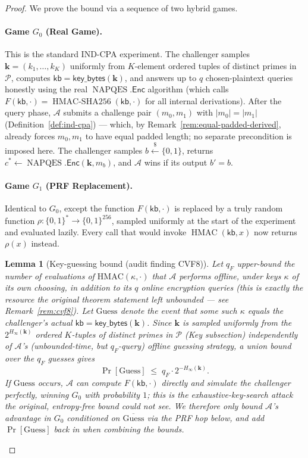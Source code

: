 \documentclass[11pt,a4paper]{article}
\newtheorem{lemma}[theorem]{Lemma}
\begin{document}
\begin{proof}
We prove the bound via a sequence of two hybrid games.

\paragraph{Game $G_0$ (Real Game).}
This is the standard IND-CPA experiment.  The challenger samples
$\mathbf{k}=(k_1,\ldots,k_K)$ uniformly from $K$-element ordered tuples
of distinct primes in~$\mathcal{P}$, computes $\mathsf{kb}=\mathsf{key\_bytes}(\mathbf{k})$,
and answers up to $q$ chosen-plaintext queries honestly using the real
$\operatorname{NAPQES}.\mathsf{Enc}$ algorithm (which calls
$F(\mathsf{kb},\cdot)=\operatorname{HMAC\text{-}SHA256}(\mathsf{kb},\cdot)$
for all internal derivations).  After the query phase,
$\mathcal{A}$ submits a challenge pair $(m_0,m_1)$ with $|m_0|=|m_1|$
(Definition~\ref{def:ind-cpa}) --- which, by
Remark~\ref{rem:equal-padded-derived}, already forces $m_0,m_1$ to have
equal padded length; no separate precondition is imposed here.
The challenger samples $b\xleftarrow{\$}\{0,1\}$, returns
$c^*\gets\operatorname{NAPQES}.\mathsf{Enc}(\mathbf{k},m_b)$, and
$\mathcal{A}$ wins if its output $b'=b$.

\paragraph{Game $G_1$ (PRF Replacement).}
Identical to $G_0$, except the function $F(\mathsf{kb},\cdot)$ is
replaced by a truly random function $\rho:\{0,1\}^*\to\{0,1\}^{256}$,
sampled uniformly at the start of the experiment and evaluated lazily.
Every call that would invoke $\operatorname{HMAC}(\mathsf{kb},x)$ now
returns $\rho(x)$ instead.

\begin{lemma}[Key-guessing bound (audit finding CVF8)]\label{lem:key-guess}
Let $q_F$ upper-bound the number of evaluations of
$\mathrm{HMAC}(\kappa,\cdot)$ that $\mathcal{A}$ performs \emph{offline},
under keys $\kappa$ of its own choosing, in addition to its $q$ online
encryption queries (this is exactly the resource the original theorem
statement left unbounded --- see Remark~\ref{rem:cvf8}). Let $\mathrm{Guess}$
denote the event that some such $\kappa$ equals the challenger's actual
$\mathsf{kb}=\mathsf{key\_bytes}(\mathbf{k})$. Since $\mathbf{k}$ is sampled
uniformly from the $2^{H_\infty(\mathbf{k})}$ ordered $K$-tuples of distinct
primes in $\mathcal{P}$ (Key subsection) independently of $\mathcal{A}$'s
(unbounded-time, but $q_F$-query) offline guessing strategy, a union bound
over the $q_F$ guesses gives
\[
  \Pr[\mathrm{Guess}] \;\leq\; q_F \cdot 2^{-H_\infty(\mathbf{k})}.
\]
If $\mathrm{Guess}$ occurs, $\mathcal{A}$ can compute
$F(\mathsf{kb},\cdot)$ directly and simulate the challenger perfectly,
winning $G_0$ with probability $1$; this is the exhaustive-key-search
attack the original, entropy-free bound could not see. We therefore only
bound $\mathcal{A}$'s advantage in $G_0$ conditioned on
$\overline{\mathrm{Guess}}$ via the PRF hop below, and add
$\Pr[\mathrm{Guess}]$ back in when combining the bounds.
\end{lemma}


\end{proof}
\end{document}
